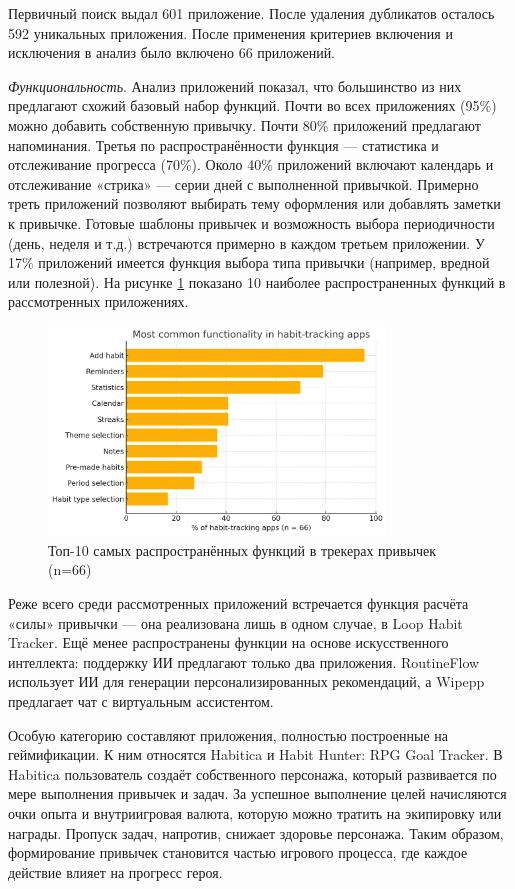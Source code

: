\documentclass[pdflatex,sn-mathphys-num]{sn-jnl}%
\theoremstyle{thmstyleone}%
\theoremstyle{thmstyletwo}%
\theoremstyle{thmstylethree}%
\begin{document}
Первичный поиск выдал 601 приложение. После удаления дубликатов осталось 592 уникальных приложения. После применения критериев включения и исключения в анализ было включено 66 приложений.

\textit{Функциональность}. Анализ приложений показал, что большинство из них предлагают схожий базовый набор функций. Почти во всех приложениях (95\%) можно добавить собственную привычку. Почти 80\% приложений предлагают напоминания. Третья по распространённости функция — статистика и отслеживание прогресса (70\%). Около 40\% приложений включают календарь и отслеживание «стрика» — серии дней с выполненной привычкой. Примерно треть приложений позволяют выбирать тему оформления или добавлять заметки к привычке. Готовые шаблоны привычек и возможность выбора периодичности (день, неделя и т.д.) встречаются примерно в каждом третьем приложении. У 17\% приложений имеется функция выбора типа привычки (например, вредной или полезной). На рисунке \ref{fig:top_features} показано 10 наиболее распространенных функций в рассмотренных приложениях.
 
\begin{figure}[]
\centering
\includegraphics[width=0.8\textwidth]{figures/top_features_chart.png}
\caption{Топ-10 самых распространённых функций в трекерах привычек (n=66)}
\label{fig:top_features}
\end{figure}

Реже всего среди рассмотренных приложений встречается функция расчёта «силы» привычки — она реализована лишь в одном случае, в Loop Habit Tracker. Ещё менее распространены функции на основе искусственного интеллекта: поддержку ИИ предлагают только два приложения. RoutineFlow использует ИИ для генерации персонализированных рекомендаций, а Wipepp предлагает чат с виртуальным ассистентом.

Особую категорию составляют приложения, полностью построенные на геймификации. К ним относятся Habitica и Habit Hunter: RPG Goal Tracker. В Habitica пользователь создаёт собственного персонажа, который развивается по мере выполнения привычек и задач. За успешное выполнение целей начисляются очки опыта и внутриигровая валюта, которую можно тратить на экипировку или награды. Пропуск задач, напротив, снижает здоровье персонажа. Таким образом, формирование привычек становится частью игрового процесса, где каждое действие влияет на прогресс героя. 
\end{document}
